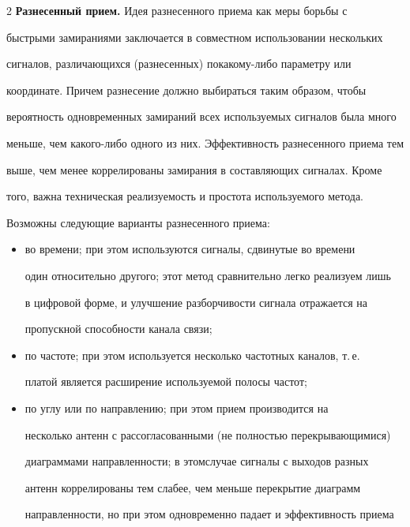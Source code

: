 \begin{multicols}{2}
     \textbf{Разнесенный прием.} Идея разнесенного приема как меры борьбы с 


быстрыми замираниями заключается в совместном использовании нескольких 


сигналов, различающихся (разнесенных) по\linebreak ка\-ко\-му-ли\-бо параметру или 


координате. Причем разнесение должно выбираться таким образом, чтобы 


вероятность одновременных замираний всех используемых сигналов была много 


меньше, чем ка\-ко\-го-ли\-бо одного из них. Эффективность разнесенного приема тем 


выше, чем менее коррелированы замирания в составляющих сигналах. Кроме 


того, важна техническая реализуемость и простота используемого метода. 


Возможны следующие варианты разнесенного приема:


     \begin{itemize}


\item во времени; при этом используются сигналы, сдвинутые во времени 


один относительно другого; этот метод сравнительно легко реализуем лишь 


в цифровой форме, и улучшение разборчивости сигнала отражается на 


пропускной способности канала связи;\\[-15pt]


\item по частоте; при этом используется несколько частотных каналов, т.\,е.\ 


платой является расширение используемой полосы частот;\\[-15pt]


\item по углу или по направлению; при этом прием производится на 


несколько антенн с рассогласованными (не полностью пе\-ре\-кры\-ва\-ющи\-ми\-ся) 


диаграммами направленности; в этом\linebreak случае сигналы с выходов разных 


антенн коррелированы тем слабее, чем меньше перекрытие диаграмм 


направленности, но при этом одновременно падает и эффективность приема 



\end{itemize}
\end{multicols}
